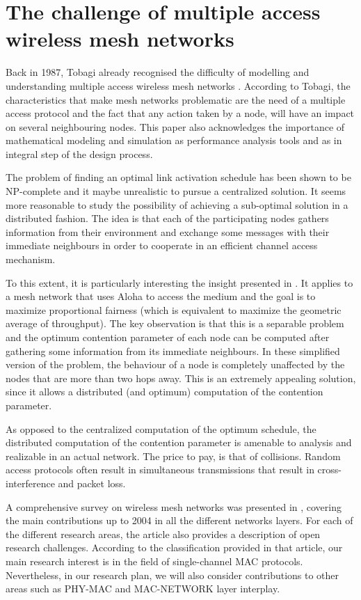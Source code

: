 \documentclass[a4paper,twocolumns]{article}%
\begin{document}
\section{The challenge of multiple access wireless mesh networks}

Back in 1987, Tobagi already recognised the difficulty of modelling and understanding multiple access wireless mesh networks \cite{tobagi1987mpa}.
According to Tobagi,  the characteristics that make mesh networks problematic are the need of a multiple access protocol and the fact that any action taken by a node, will have an  impact on several neighbouring nodes.
This paper also acknowledges the importance of mathematical modeling and simulation as performance analysis tools and as in integral step of the design process.

The problem of finding an optimal link activation schedule has been shown to be NP-complete \cite{arikan1984scr,ramanathan1993sam} and it maybe unrealistic to pursue a centralized solution.
It seems more reasonable to study the possibility of achieving a sub-optimal solution in a distributed fashion.
The idea is that each of the participating nodes gathers information from their environment and exchange some messages with their immediate neighbours in order to cooperate in an efficient channel access mechanism.

To this extent, it is particularly interesting the insight presented in \cite{kar2004apf}.
It applies to a mesh network that uses Aloha to access the medium and the goal is to maximize proportional fairness (which is equivalent to maximize the geometric average of throughput).
The key observation is that this is a separable problem and the optimum contention parameter of each node can be computed after gathering some information from its immediate neighbours.
In these simplified version of the problem, the behaviour of a node is completely unaffected by the nodes that are more than two hops away.
This is an extremely appealing solution, since it allows a distributed (and optimum) computation of the contention parameter.

As opposed to the centralized computation of the optimum schedule, the distributed computation of the contention parameter is amenable to analysis and realizable in an actual network.
The price to pay, is that of collisions.
Random access protocols often result in simultaneous transmissions that result in cross-interference and packet loss.

A comprehensive survey on wireless mesh networks was presented in \cite{akyildiz2005wmn}, covering the main contributions up to 2004 in all the different networks layers.
For each of the different research areas, the article also provides a description of open research challenges.
According to the classification provided in that article, our main research interest is in the field of single-channel MAC protocols.
Nevertheless, in our research plan, we will also consider contributions to other areas such as PHY-MAC and MAC-NETWORK layer interplay.
\end{document}
